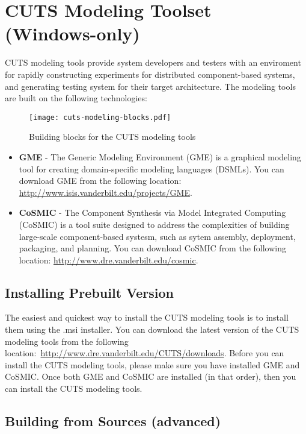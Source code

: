 \section{CUTS Modeling Toolset (Windows-only)}

CUTS modeling tools provide system developers and testers with an enviroment
for rapidly constructing experiments for distributed component-based systems,
and generating testing system for their target architecture. The modeling
tools are built on the following technologies:
\begin{figure}[htbp]
  \centering
  \texttt{[image: cuts-modeling-blocks.pdf]}
  \caption{Building blocks for the CUTS modeling tools}
  \label{fig:cuts-modeling-blocks}
\end{figure}

\begin{itemize}
  \item \textbf{GME} - The Generic Modeling Environment (GME) is a graphical
  modeling tool for creating domain-specific modeling languages (DSMLs). You
  can download GME from the following location: \url{http://www.isis.vanderbilt.edu/projects/GME}.

  \item \textbf{CoSMIC} - The Component Synthesis via Model Integrated 
  Computing (CoSMIC) is a tool suite designed to address the complexities of
  building large-scale component-based systesm, such as sytem assembly, 
  deployment, packaging, and planning. You can download CoSMIC from the following
  location: \url{http://www.dre.vanderbilt.edu/cosmic}.
\end{itemize}

\subsection{Installing Prebuilt Version}

The easiest and quickest way to install the CUTS modeling tools is to install
them using the .msi installer. You can download the latest version of the 
CUTS modeling tools from the following location:~\url{http://www.dre.vanderbilt.edu/CUTS/downloads}.
Before you can install the CUTS modeling tools, please make sure you have
installed GME and CoSMIC. Once both GME and CoSMIC are installed (in that
order), then you can install the CUTS modeling tools.

\subsection{Building from Sources (advanced)}

